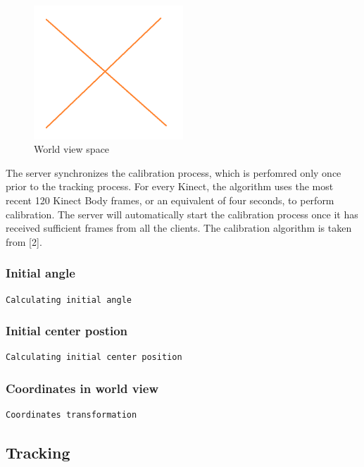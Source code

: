 \documentclass[paper=a4, fontsize=11pt]{scrartcl}
\numberwithin{equation}{section}		%
\numberwithin{figure}{section}			%
\numberwithin{table}{section}				%
\begin{document}
\begin{figure}[H]
	\centering
	\includegraphics[width=0.5\textwidth]{na}
	\caption{World view space}
	\label{fig:world_view_space}
\end{figure}

The server synchronizes the calibration process, which is perfomred only once prior to the tracking process. For every Kinect, the algorithm uses the most recent 120 Kinect Body frames, or an equivalent of four seconds, to perform calibration. The server will automatically start the calibration process once it has received sufficient frames from all the clients. The calibration algorithm is taken from [2].

\subsubsection{Initial angle}

\begin{lstlisting}
Calculating initial angle
\end{lstlisting}

\subsubsection{Initial center postion}

\begin{lstlisting}
Calculating initial center position
\end{lstlisting}

\subsubsection{Coordinates in world view}

\begin{lstlisting}
Coordinates transformation
\end{lstlisting}

\subsection{Tracking}
\end{document}
